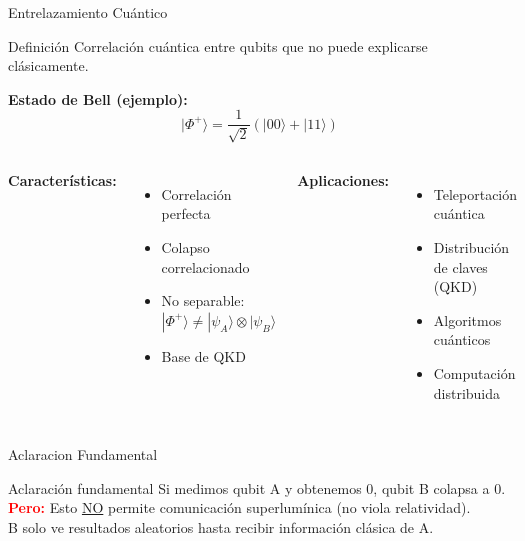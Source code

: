 \documentclass[aspectratio=169]{beamer}
\begin{document}
\begin{frame}{Entrelazamiento Cuántico}
\small
\begin{block}{Definición}
Correlación cuántica entre qubits que no puede explicarse clásicamente.
\end{block}

\textbf{Estado de Bell (ejemplo):}
\[
|\Phi^+\rangle = \frac{1}{\sqrt{2}}(|00\rangle + |11\rangle)
\]

\begin{columns}[c]
\textbf{Características:}
\begin{itemize}
\item Correlación perfecta
\item Colapso correlacionado
\item No separable: $|\Phi^+\rangle \neq |\psi_A\rangle \otimes |\psi_B\rangle$
\item Base de QKD
\end{itemize}

\textbf{Aplicaciones:}
\begin{itemize}
\item Teleportación cuántica
\item Distribución de claves (QKD)
\item Algoritmos cuánticos
\item Computación distribuida
\end{itemize}
\end{columns}

\end{frame}

\begin{frame}{Aclaracion Fundamental}

\begin{alertblock}{Aclaración fundamental}
Si medimos qubit A y obtenemos 0, qubit B colapsa a 0.\\
\textcolor{red}{\textbf{Pero:}} Esto \underline{NO} permite comunicación superlumínica (no viola relatividad).\\
B solo ve resultados aleatorios hasta recibir información clásica de A.
\end{alertblock}

\end{frame}
\end{document}
